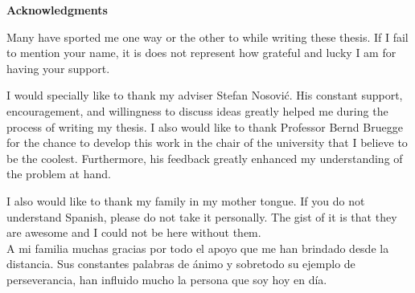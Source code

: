 \clearemptydoublepage
{}
{}	



\vspace*{2cm}

\begin{center}
{\Large \bf Acknowledgments}
\end{center}

\vspace{1cm}


Many have sported me one way or the other to while writing these thesis. If I fail to mention your name, it is does not represent how grateful and lucky I am for having your support. 

I would specially like to thank my adviser Stefan Nosovi\'{c}. His constant support, encouragement, and willingness to discuss ideas greatly helped me during the process of writing my thesis. I also would like to thank Professor Bernd Bruegge for the chance to develop this work in the chair of the university that I believe to be the coolest. Furthermore, his feedback greatly enhanced my understanding of the problem at hand.

I also would like to thank my family in my mother tongue. If you do not understand Spanish, please do not take it personally. The gist of it is that they are awesome and I could not be here without them.\\
A mi familia muchas gracias por todo el apoyo que me han brindado desde la distancia. Sus constantes palabras de \'{a}nimo y sobretodo su ejemplo de perseverancia, han influido mucho la persona que soy hoy en d\'{i}a. 
